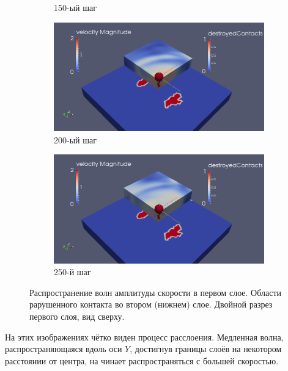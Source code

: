\begin{figure}[H]
\begin{subfigure}[b]{0.5\textwidth}
\caption{150-ый шаг}
\end{subfigure}
\begin{subfigure}[b]{0.5\textwidth}
\centering
\includegraphics[width=1.0\textwidth]{png/delamination/double_clip/200.png}
\caption{200-ый шаг}
\end{subfigure}
\begin{subfigure}[b]{0.5\textwidth}
\centering
\includegraphics[width=1.0\textwidth]{png/delamination/double_clip/250.png}
\caption{250-й шаг}
\end{subfigure}
\caption{Распространение волн амплитуды скорости в первом слое. Области рарушенного контакта во втором (нижнем) слое. Двойной разрез первого слоя, вид сверху.}
\label{pic:delamination_double_clip}
\end{figure}

	На этих изображениях чётко виден процесс расслоения.
	Медленная волна, распространяющаяся вдоль оси $Y$, достигнув границы слоёв на некотором расстоянии от центра, на чинает распространяться с большей скоростью.

